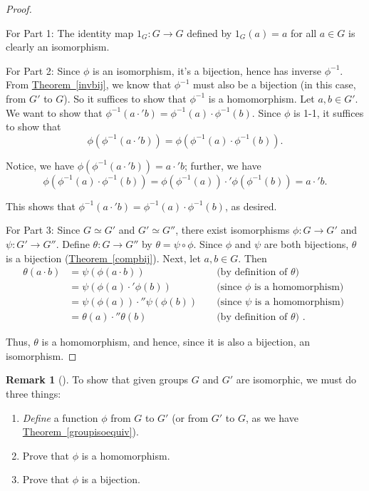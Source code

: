 \documentclass[10pt,]{book}
\theoremstyle{plain}
\theoremstyle{definition}
\theoremstyle{definition}
\newtheorem{remark}[theorem]{Remark}
\theoremstyle{definition}
\theoremstyle{definition}
\numberwithin{equation}{section}
\newcommand{\amp}{&}
\begin{document}
\begin{proof}\hypertarget{proof-17}{}
For Part 1: The identity map \(1_G:G\to G\) defined by \(1_G(a)=a\) for all \(a\in G\) is clearly an isomorphism.%
\par
For Part 2: Since \(\phi\) is an isomorphism, it's a bijection, hence has inverse \(\phi^{-1}\). From \hyperref[invbij]{Theorem~\ref{invbij}}, we know that \(\phi^{-1}\) must also be a bijection (in this case, from \(G'\) to \(G\)). So it suffices to show that \(\phi^{-1}\) is a homomorphism. Let \(a,b\in G'\). We want to show that \(\phi^{-1}(a\cdot'b)=\phi^{-1}(a)\cdot\phi^{-1}(b)\). Since \(\phi\) is 1-1, it suffices to show that%
\begin{equation*}
\phi(\phi^{-1}(a\cdot'b))=\phi(\phi^{-1}(a)\cdot\phi^{-1}(b)).
\end{equation*}
%
\par
Notice, we have \(\phi(\phi^{-1}(a\cdot'b))=a\cdot'b\); further, we have%
\begin{equation*}
\phi(\phi^{-1}(a)\cdot\phi^{-1}(b))=\phi(\phi^{-1}(a))\cdot'\phi(\phi^{-1}(b))=a\cdot'b.
\end{equation*}
%
\par
This shows that \(\phi^{-1}(a\cdot'b)=\phi^{-1}(a)\cdot\phi^{-1}(b)\), as desired.%
\par
For Part 3: Since \(G\simeq G'\) and \(G'\simeq G''\), there exist isomorphisms \(\phi:G\to G'\) and \(\psi:G'\to G''\). Define \(\theta:G\to G''\) by \(\theta=\psi \circ \phi\). Since \(\phi\) and \(\psi\) are both bijections, \(\theta\) is a bijection (\hyperref[compbij]{Theorem~\ref{compbij}}). Next, let \(a,b\in G\). Then%
\begin{align*}
\theta(a\cdot b)\amp =\psi(\phi(a\cdot b))\amp \amp \text{ (by definition of \(\theta\)) }\\
\amp =\psi(\phi(a)\cdot'\phi(b))\amp \amp \text{ (since \(\phi\) is a homomorphism) }\\
\amp =\psi(\phi(a))\cdot''\psi(\phi(b))\amp \amp \text{ (since \(\psi\) is a homomorphism) }\\
\amp =\theta(a)\cdot''\theta(b)\amp \amp \text{ (by definition of \(\theta\)) } .
\end{align*}
%
\par
Thus, \(\theta\) is a homomorphism, and hence, since it is also a bijection, an isomorphism.%
\end{proof}
\begin{remark}[]\label{remark-18}
To show that given groups \(G\) and \(G'\) are isomorphic, we must do three things: \leavevmode%
\begin{enumerate}
\item\hypertarget{li-148}{}\emph{Define} a function \(\phi\) from \(G\) to \(G'\) (or from \(G'\) to \(G\), as we have \hyperref[groupisoequiv]{Theorem~\ref{groupisoequiv}}).%
\item\hypertarget{li-149}{}Prove that \(\phi\) is a homomorphism.%
\item\hypertarget{li-150}{}Prove that \(\phi\) is a bijection.%
\end{enumerate}
%
\end{remark}
\end{document}
